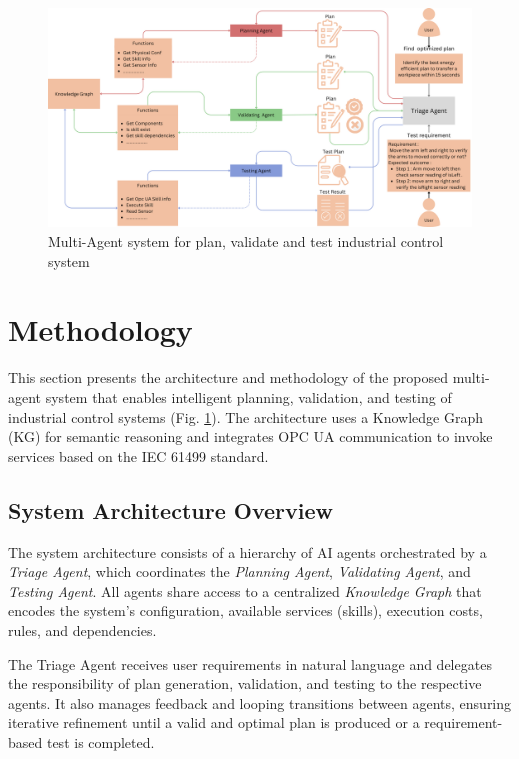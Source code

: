 \documentclass[conference]{IEEEtran}
\begin{document}
\begin{figure}
    \includegraphics[width=1\textwidth]{images/arch.png}
    \caption{Multi-Agent system for plan, validate and test industrial control system  }
    \label{fig:arch}
\end{figure}

\section{Methodology}
\label{methodlogy}

This section presents the architecture and methodology of the proposed multi-agent system that enables intelligent planning, validation, and testing of industrial control systems (Fig. \ref{fig:arch}). The architecture uses a Knowledge Graph (KG) for semantic reasoning and integrates OPC UA communication to invoke services based on the IEC 61499 standard.

\subsection{System Architecture Overview}

The system architecture consists of a hierarchy of AI agents orchestrated by a \textit{Triage Agent}, which coordinates the \textit{Planning Agent}, \textit{Validating Agent}, and \textit{Testing Agent}. All agents share access to a centralized \textit{Knowledge Graph} that encodes the system’s configuration, available services (skills), execution costs, rules, and dependencies.

The Triage Agent receives user requirements in natural language and delegates the responsibility of plan generation, validation, and testing to the respective agents. It also manages feedback and looping transitions between agents, ensuring iterative refinement until a valid and optimal plan is produced or a requirement-based test is completed.
\end{document}
